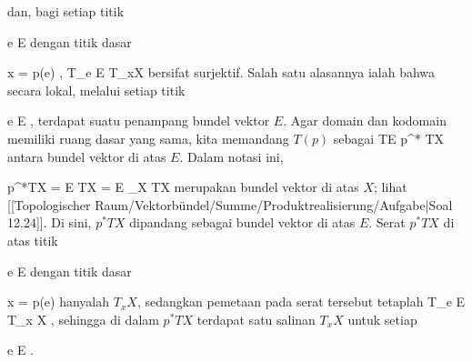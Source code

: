 dan, bagi setiap titik

\mavergleichskette
{\vergleichskette
{ e
}
{ \in }{ E
}
{  }{
}
{    }{
}
{   }{
}
}
{}{}{}
dengan titik dasar

\mavergleichskette
{\vergleichskette
{ x
}
{ = }{ p(e)
}
{  }{
}
{    }{
}
{   }{
}
}
{}{}{,}
 {T_e E} { T_{x}X
} {}
bersifat surjektif. Salah satu alasannya ialah bahwa secara lokal, melalui setiap titik

\mavergleichskette
{\vergleichskette
{ e
}
{ \in }{ E
}
{  }{
}
{    }{
}
{   }{
}
}
{}{}{,}
terdapat suatu penampang bundel vektor $E$. Agar domain dan kodomain memiliki ruang dasar yang sama, kita memandang $T(p)$ sebagai
 {TE} { p^* TX
} {}
antara bundel vektor di atas $E$. Dalam notasi ini,

\mavergleichskettedisp
{\vergleichskette
{ p^*TX
}
{ =} { E \oplus TX
}
{ =} { E \times_X TX
}
{ } {
}
{ } {
}
}
{}{}{}
merupakan
bundel vektor di atas $X$; lihat
[[Topologischer Raum/Vektorbündel/Summe/Produktrealisierung/Aufgabe|Soal 12.24]].
Di sini, $p^*TX$ dipandang sebagai bundel vektor di atas $E$. Serat $p^*TX$ di atas titik

\mavergleichskette
{\vergleichskette
{ e
}
{ \in }{ E
}
{  }{
}
{    }{
}
{   }{
}
}
{}{}{}
dengan titik dasar

\mavergleichskette
{\vergleichskette
{ x
}
{ = }{ p(e)
}
{  }{
}
{    }{
}
{   }{
}
}
{}{}{}
hanyalah $T_{x}X$, sedangkan pemetaan pada serat tersebut tetaplah
 { T_e E } { T_{x} X
} {,}
sehingga di dalam $p^*TX$ terdapat satu salinan $T_{x} X$ untuk setiap

\mavergleichskette
{\vergleichskette
{ e
}
{ \in }{ E
}
{  }{
}
{    }{
}
{   }{
}
}
{}{}{.}

